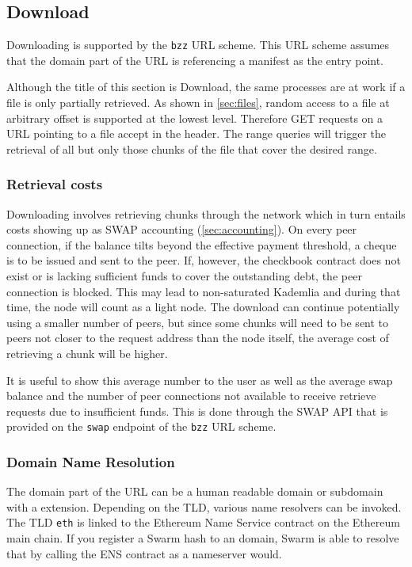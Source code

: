\subsection{Download \statusgreen}\label{sec:download}

Downloading is supported by the \lstinline{bzz} URL scheme. This URL scheme assumes that the domain part of the URL is referencing a manifest as the entry point. 

Although the title of this section is Download, the same  processes are at work if a file is only partially retrieved. As shown in \ref{sec:files}, random access to a file at arbitrary offset is supported at the lowest level. Therefore GET requests on a URL pointing to a file accept  in the header. The range queries will trigger the retrieval of all but only those chunks of the file that cover the desired range.  

\subsubsection{Retrieval costs}

Downloading involves retrieving chunks through the network which in turn entails costs showing up as SWAP accounting (\ref{sec:accounting}). On every peer connection, if the balance tilts beyond the effective payment threshold, a cheque is to be issued and sent to the peer. If, however, the checkbook contract does not exist or is lacking sufficient funds to cover the outstanding debt, the peer connection is blocked. This may lead to non-saturated Kademlia and during that time, the node will count as a light node. The download can continue potentially using a smaller number of peers, but since some chunks will need to be sent to peers not closer to the request address than the node itself, the average cost of retrieving a chunk will be higher. 

It is useful to show this average number to the user as well as the average swap balance and the number of peer connections not available to receive retrieve requests due to insufficient funds. This is done through the SWAP API that is provided on the \lstinline{swap} endpoint of the \lstinline{bzz} URL scheme.


\subsubsection{Domain Name Resolution}

The domain part of the URL can be a human readable domain or subdomain with a  extension. Depending on the TLD, various name resolvers can be invoked. The TLD \lstinline{eth} is linked to the Ethereum Name Service contract on the Ethereum main chain. If you register a Swarm hash to an  domain, Swarm is able to resolve that by calling the ENS contract as a nameserver would. 

